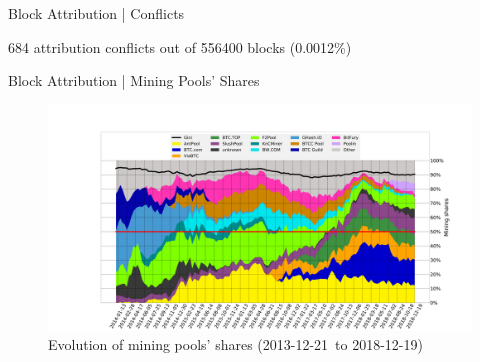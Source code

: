 \documentclass[10pt]{beamer}
\def\stackplotStart{2013-12-21}
\def\stackplotEnd{2018-12-19}
\begin{document}
\begin{frame}[fragile]{Block Attribution | Conflicts}
    \setlength{\tabcolsep}{2pt}
    \begin{table}
        684 attribution conflicts out of 556400 blocks (0.0012\%)
    \end{table}
\end{frame}

\begin{frame}[fragile]{Block Attribution | Mining Pools' Shares}
        \vspace*{-0.77cm}
        \begin{figure}
            \hspace*{-1.7cm}
            \includegraphics[width=1.23\textwidth]{images/stackplot_periodLen_2016secs_end_554399_numPeriods_138_threshold_4_groupBy_miner.pdf}
            \\Evolution of mining pools' shares (\stackplotStart~to \stackplotEnd)
        \end{figure}
\end{frame}
\end{document}

